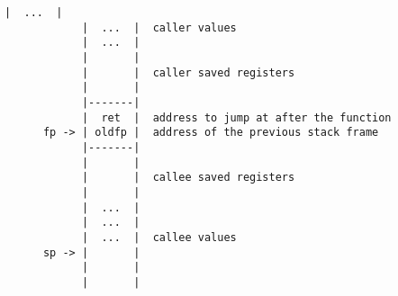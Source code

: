 \begin{Verbatim}[baselinestretch=0.2]
            |  ...  |
            |  ...  |  caller values
            |  ...  |
            |       |
            |       |  caller saved registers
            |       |
            |-------|
            |  ret  |  address to jump at after the function
      fp -> | oldfp |  address of the previous stack frame
            |-------|
            |       |
            |       |  callee saved registers
            |       |
            |  ...  |
            |  ...  |
            |  ...  |  callee values
      sp -> |       |
            |       |
            |       |
\end{Verbatim}
